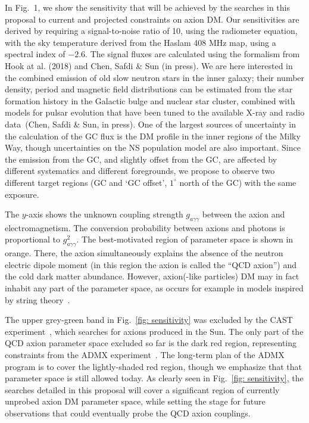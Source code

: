 \documentclass[a4paper, 11pt]{article}
\begin{document}
\medskip
 
In Fig.~1, we show the sensitivity that will be achieved by the searches in this proposal to current and projected constraints on axion DM. Our sensitivities are derived by requiring a signal-to-noise ratio of 10, using the radiometer equation, with the sky temperature derived from the Haslam 408 MHz map, using a spectral index of $-2.6$.  The signal fluxes are calculated using the formalism from Hook at al. (2018) and Chen, Safdi \& Sun (in press).  We are here interested in the combined emission of old slow neutron stars in the inner galaxy; their number density, period and magnetic field distributions can be estimated from the star formation history in the Galactic bulge and nuclear star cluster, combined with models for pulsar evolution that have been tuned to the available X-ray and radio data~(Chen, Safdi \& Sun, in press).  One of the largest sources of uncertainty in the calculation of the GC flux is the DM profile in the inner regions of the Milky Way, though uncertainties on the NS population model are also important.   Since the emission from the GC, and slightly offset from the GC, are affected by different systematics and different foregrounds, we propose to observe two different target regions (GC and `GC offset', $1^\circ$ north of the GC) with the same exposure.

The $y$-axis shows the unknown coupling strength $g_{a \gamma \gamma}$ between the axion and electromagnetism.  The conversion probability between axions and photons is proportional to $g_{a \gamma \gamma}^2$.  The best-motivated region of parameter space is shown in orange.  There, the axion simultaneously explains the absence of the neutron electric dipole moment (in this region the axion is called the ``QCD axion'') and the cold dark matter abundance.  However, axion(-like particles) DM may in fact inhabit any part of the parameter space, as occurs for example in models inspired by string theory~\cite{Svrcek:2006yi}.    

The upper grey-green band in Fig.~\ref{fig: sensitivity} was excluded by the CAST experiment~\cite{Arik:2015cjv}, which searches for axions produced in the Sun.  The only part of the QCD axion parameter space excluded so far is the dark red region, representing constraints from the ADMX experiment~\cite{Du:2018uak}.  The long-term plan of the ADMX program is to cover the lightly-shaded red region, though we emphasize that that parameter space is still allowed today.  As clearly seen in Fig.~\ref{fig: sensitivity}, the searches detailed in this proposal will cover a significant region of currently unprobed axion DM parameter space, while setting the stage for future observations that could eventually probe the QCD axion couplings. 
\end{document}
